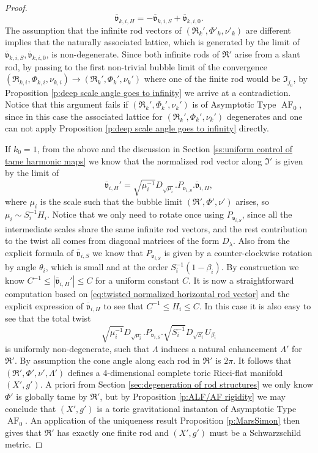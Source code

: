 \documentclass[a4paper,11pt]{amsart}
\theoremstyle{definition}
\numberwithin{equation}{section}
\newcommand{\mv} {\mathfrak v}
\newcommand{\mI} {\mathfrak I}
\newcommand{\mR} {\mathfrak R}
\DeclareMathOperator{\AF}{AF}
\begin{document}
\begin{proof}
\begin{equation}
    \overline{\mv}_{k,i,H}=-\overline{\mv}_{k,i,S}+\overline{\mv}_{k,i,0}.
\end{equation}
The assumption that the infinite rod vectors of $(\mR_k',\Phi'_k,\nu'_k)$ are different implies that the naturally associated lattice, which is generated by the limit of $\overline{\mv}_{k,i,S},\overline{\mv}_{k,i,0}$, is non-degenerate.
Since both infinite rods of $\mR'$ arise from a slant rod, by passing to the first non-trivial bubble limit of the convergence $(\mR_{k,i},\Phi_{k,i},\nu_{k,i})\to (\mR_k',\Phi_k',\nu_k')$ where one of the finite rod would be $\mI_{j_0}$, by Proposition \ref{p:deep scale angle goes to infinity} we arrive at a contradiction. Notice that this argument fails if $(\mR_k',\Phi_k',\nu_k')$ is of Asymptotic Type $\AF_0$, since in this case the associated lattice for $(\mR_k',\Phi_k',\nu_k')$ degenerates and one can not apply Proposition \ref{p:deep scale angle goes to infinity} directly.  





If $k_0=1$, from the above and the discussion in Section \ref{ss:uniform control of tame harmonic maps} we know that the normalized rod vector along $\mI'$ is given by the limit of 
\begin{equation}\label{eq:twisted normalized horizontal rod vector}
    \overline{\mv}_{i,H}'=\sqrt{\mu_i^{-1}}D_{\sqrt{\mu_i}}.P_{\mv_{i, S}}.\overline{\mv}_{i, H},
\end{equation} 
where $\mu_i$ is the scale such that the bubble limit $(\mR',\Phi',\nu')$ arises, so $\mu_i\sim S_i^{-1}H_i$. Notice that we only need to rotate once using $P_{\mv_{i, S}}$, since all the intermediate scales share the same infinite rod vectors, and the rest contribution to the twist all comes from diagonal matrices of the form $D_\lambda$. Also from the explicit formula of $\overline{\mv}_{i, S}$ we know that $P_{\mv_{i, S}}$ is given by a counter-clockwise rotation by angle $\theta_i$, which is small and at the order $S_i^{-1}(1-\beta_i)$. By construction we know $C^{-1}\leq |\overline{\mv}_{i,H}'|\leq C$ for a uniform constant $C$. It is now a straightforward computation based on \eqref{eq:twisted normalized horizontal rod vector} and the explicit expression of $\overline{\mv}_{i,H}$ to see that $C^{-1}\leq H_i\leq C$.
In this case it is also easy to see that the total twist $$\sqrt{\mu_i^{-1}}D_{\sqrt{\mu_i}}.P_{\mv_{i, S}}.\sqrt{S_i^{-1}}D_{\sqrt{S_i}}U_{\beta_i}$$ is uniformly non-degenerate, such that $\Lambda$ induces a natural enhancement $\Lambda'$ for $\mR'$.  By assumption the cone angle along each rod in $\mR'$ is $2\pi$. It follows that $(\mR',\Phi',\nu', \Lambda')$ defines a 4-dimensional complete toric Ricci-flat manifold $(X',g')$. A priori from Section \ref{sec:degeneration of rod structures} we only know $\Phi'$ is globally tame by $\mR'$, but by Proposition \ref{p:ALF/AF rigidity}  we may conclude that $(X', g')$ is a toric gravitational instanton of Asymptotic Type $\AF_0$. An application of the uniqueness result Proposition \ref{p:MarsSimon} then gives that $\mR'$ has exactly one finite rod and $(X', g')$ must be a Schwarzschild metric. 







\end{proof}
\end{document}
